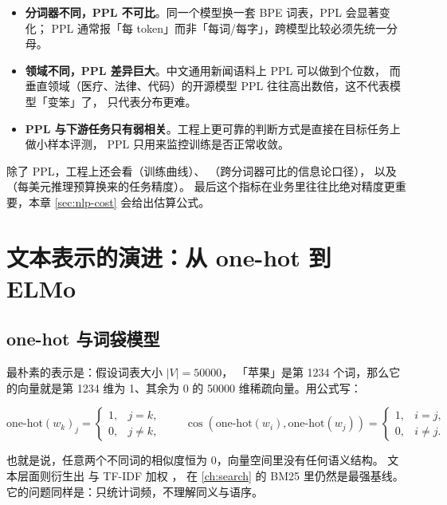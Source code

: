 \begin{itemize}
  \item \textbf{分词器不同，PPL 不可比}。同一个模型换一套 BPE 词表，PPL 会显著变化；
        PPL 通常报「每 token」而非「每词/每字」，跨模型比较必须先统一分母。
  \item \textbf{领域不同，PPL 差异巨大}。中文通用新闻语料上 PPL 可以做到个位数，
        而垂直领域（医疗、法律、代码）的开源模型 PPL 往往高出数倍，这不代表模型「变笨」了，
        只代表分布更难。
  \item \textbf{PPL 与下游任务只有弱相关}。工程上更可靠的判断方式是直接在目标任务上做小样本评测，
        PPL 只用来监控训练是否正常收敛。
\end{itemize}

除了 PPL，工程上还会看（训练曲线）、
（跨分词器可比的信息论口径），
以及（每美元推理预算换来的任务精度）。
最后这个指标在业务里往往比绝对精度更重要，本章 \cref{sec:nlp-cost} 会给出估算公式。

\section{文本表示的演进：从 one-hot 到 ELMo}
\label{sec:nlp-representation}

\subsection{one-hot 与词袋模型}

最朴素的表示是：假设词表大小 $|V| = 50000$，
「苹果」是第 1234 个词，那么它的向量就是第 1234 维为 1、其余为 0 的 50000 维稀疏向量。用公式写：

\begin{equation}
\text{one-hot}(w_k)_j = \begin{cases} 1, & j = k, \\ 0, & j \ne k, \end{cases}
\qquad
\cos(\text{one-hot}(w_i), \text{one-hot}(w_j)) = \begin{cases} 1, & i = j, \\ 0, & i \ne j. \end{cases}
\label{eq:onehot}
\end{equation}

也就是说，任意两个不同词的相似度恒为 0，向量空间里没有任何语义结构。
文本层面则衍生出 与 TF-IDF 加权 \cite{salton1975vsm}，
在 \cref{ch:search} 的 BM25 里仍然是最强基线。它的问题同样是：只统计词频，不理解同义与语序。

